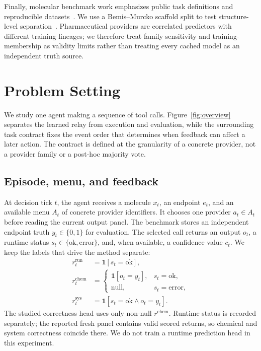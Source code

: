 \documentclass[sigconf,anonymous]{aamas}
\begin{document}
Finally, molecular benchmark work emphasizes public task definitions and reproducible datasets~\cite{huang2021tdc,wu2018moleculenet,meng2021b3db}. We use a Bemis--Murcko scaffold split to test structure-level separation~\cite{bemis1996frameworks}. Pharmaceutical providers are correlated predictors with different training lineages; we therefore treat family sensitivity and training-membership as validity limits rather than treating every cached model as an independent truth source.

\section{Problem Setting}
We study one agent making a sequence of tool calls. Figure~\ref{fig:overview} separates the learned relay from execution and evaluation, while the surrounding task contract fixes the event order that determines when feedback can affect a later action. The contract is defined at the granularity of a concrete provider, not a provider family or a post-hoc majority vote.

\subsection{Episode, menu, and feedback}
At decision tick $t$, the agent receives a molecule $x_t$, an endpoint $e_t$, and an available menu $A_t$ of concrete provider identifiers. It chooses one provider $a_t\in A_t$ before reading the current output panel. The benchmark stores an independent endpoint truth $y_t\in\{0,1\}$ for evaluation. The selected call returns an output $o_t$, a runtime status $s_t\in\{\mathrm{ok},\mathrm{error}\}$, and, when available, a confidence value $c_t$. We keep the labels that drive the method separate:
$$
\begin{aligned}
 r_t^{\mathrm{run}}&=\mathbf{1}[s_t=\mathrm{ok}],\\
 r_t^{\mathrm{chem}}&=\begin{cases}\mathbf{1}[o_t=y_t],&s_t=\mathrm{ok},\\ \mathrm{null},&s_t=\mathrm{error},\end{cases}\\
 r_t^{\mathrm{sys}}&=\mathbf{1}[s_t=\mathrm{ok}\land o_t=y_t].
\end{aligned}
$$
The studied correctness head uses only non-null $r^{\mathrm{chem}}$. Runtime status is recorded separately; the reported fresh panel contains valid scored returns, so chemical and system correctness coincide there. We do not train a runtime prediction head in this experiment.
\end{document}
